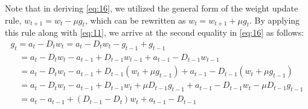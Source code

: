 Note that in deriving \eqref{eq:16}, we utilized the general form of the weight update rule, \( w_{t+1} = w_t - \mu g_t \), which can be rewritten as \( w_t = w_{t+1} + \mu g_t \). By applying this rule along with \eqref{eq:11}, we arrive at the second equality in \eqref{eq:16} as follows:
\begin{equation*}
\begin{gathered}
    g_t = a_t - D_t w_t = a_t - D_t w_t - g_{t-1} + g_{t-1}  \\ \quad
    = a_t - D_t w_t - a_{t-1} + D_{t-1}w_{t-1} + a_{t-1} - D_{t-1}w_{t-1} \\ \quad
    = a_t - D_t w_t - a_{t-1} + D_{t-1}(w_t + \mu g_{t-1}) + a_{t-1} - D_{t-1}(w_t + \mu g_{t-1}) \\ \quad
    = a_t - D_t w_t - a_{t-1} + D_{t-1}w_t + \mu D_{t-1} g_{t-1} + a_{t-1} - D_{t-1}w_t - \mu D_{t-1} g_{t-1} \\ \quad
    = a_t - a_{t-1} + (D_{t-1} - D_t)w_t + a_{t-1} - D_{t-1}
\end{gathered}
\end{equation*}

